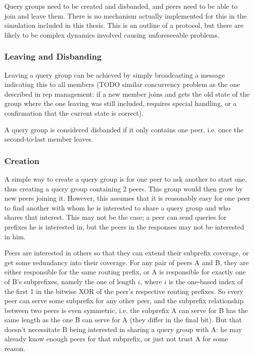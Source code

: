 Query groups need to be created and disbanded, and peers need to be able to join
and leave them. There is no mechanism actually implemented for this in the
simulation included in this thesis. This is an outline of a protocol, but there
are likely to be complex dynamics involved causing unforeseeable problems.

\subsubsection{Leaving and Disbanding}
Leaving a query group can be achieved by simply broadcasting a message
indicating this to all members (TODO similar concurrency problem as the one
described in rep management: if a new member joins and gets the old state of the
group where the one leaving was still included, requires special handling, or a
confirmation that the current state is correct).

A query group is considered disbanded if it only contains one peer, i.e. once
the second-to-last member leaves.

\subsubsection{Creation}
A simple way to create a query group is for one peer to ask another to start
one, thus creating a query group containing 2 peers. This group would then grow
by new peers joining it. However, this assumes that it is reasonably easy for
one peer to find another with whom he is interested to share a query group and
who shares that interest. This may not be the case; a peer can send queries for
prefixes he is interested in, but the peers in the responses may not be
interested in him.

Peers are interested in others so that they can extend their subprefix coverage,
or get some redundancy into their coverage. For any pair of peers A and B, they
are either responsible for the same routing prefix, or A is responsible for
exactly one of B's subprefixes, namely the one of length $i$, where $i$ is the
one-based index of the first 1 in the bitwise XOR of the peer's respective
routing prefixes. So every peer can serve some subprefix for any other peer, and
the subprefix relationship between two peers is even symmetric, i.e. the
subprefix A can serve for B has the same length as the one B can serve for A
(they differ in the final bit). But that doesn't necessitate B being interested
in sharing a query group with A: he may already know enough peers for that
subprefix, or just not trust A for some reason.

